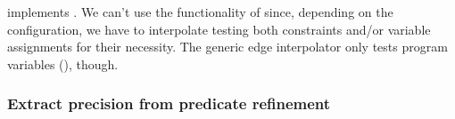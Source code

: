  implements .
We can't use the functionality of  since, depending on the configuration, we have to interpolate
testing both constraints and/or variable assignments for their necessity.
The generic edge interpolator only tests program variables (), though.



\subsubsection{Extract precision from predicate refinement}
